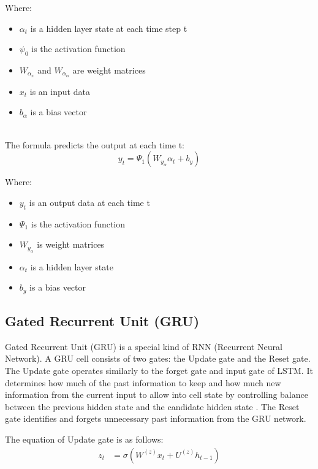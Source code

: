 \documentclass{ieeeojies}
\begin{document}
Where:\\
    \begin{itemize}
        \item $\alpha_t$ is a hidden layer state at each time step t
        \item $\psi_0$ is the activation function
        \item $W_\alpha_x$ and $W_\alpha_\alpha$ are weight matrices
        \item $x_t$ is an input data
        \item $b_\alpha$ is a bias vector
    \end{itemize}\\

The formula predicts the output at each time t:\\
\[ y_t = \Psi_1(W_y_\alpha\alpha_t + b_y) \]

Where:\\
    \begin{itemize}
        \item $y_t$ is an output data at each time t
        \item $\Psi_1$ is the activation function
        \item $W_y_\alpha$ is weight matrices
        \item $\alpha_t$ is a hidden layer state
        \item $b_y$ is a bias vector
        \cite{zargar2021introduction}
    \end{itemize}

\subsection{Gated Recurrent Unit (GRU)} 
Gated Recurrent Unit (GRU) is a special kind of RNN (Recurrent Neural Network). A GRU cell consists of two gates: the Update gate and the Reset gate. The Update gate operates similarly to the forget gate and input gate of LSTM. It determines how much of the past information to keep and how much new information from the current input to allow into cell state by controlling balance between the previous hidden state and the candidate hidden state \cite{gru_balance}. The Reset gate identifies and forgets unnecessary past information from the GRU network.

The equation of Update gate is as follows:
\begin{align*}
z_t &= \sigma\left( W^{(z)} x_t + U^{(z)} h_{t-1} \right)
\end{align*}
\end{document}
